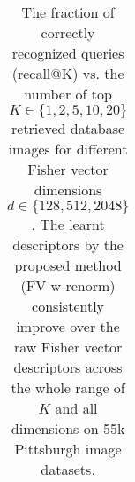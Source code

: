 \begin{table}[t!]
\begin{centering}
\begin{tabularx}{0.89\linewidth}{|l|c c c c c|}
	\end{tabularx}
	\caption{ \textcolor{myRed}{}
The fraction of correctly recognized queries (recall@K) vs. the number of top $K\in\{1,2,5,10,20\}$ retrieved database images for different Fisher vector dimensions $d\in\{128,512,2048\}$. The learnt descriptors by the proposed method (FV w renorm) consistently improve over the raw Fisher vector descriptors across the whole range of $K$ and all dimensions on 55k Pittsburgh image datasets.		
}
\label{tab:recall02}
\end{centering}
\end{table}
